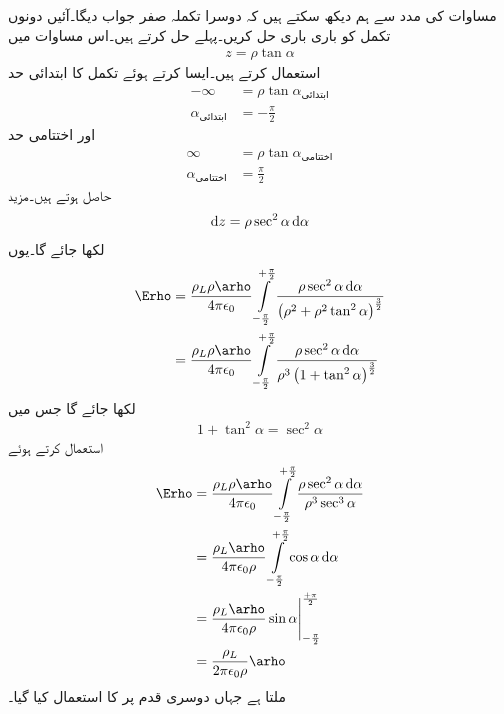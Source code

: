 مساوات  کی مدد سے ہم دیکھ سکتے ہیں کہ دوسرا تکملہ صفر جواب دیگا۔آئیں دونوں تکمل کو باری باری حل کریں۔پہلے \Erho حل کرتے ہیں۔اس مساوات میں
\begin{align*}
z=\rho \tan \alpha
\end{align*}
استعمال کرتے ہیں۔ایسا کرتے ہوئے تکمل کا ابتدائی حد 
\begin{align*}
-\infty &= \rho \tan \alpha_{\textrm{ابتدائی}}\\
\alpha_{\textrm{ابتدائی}} &= -\frac{\pi}{2}
\end{align*}
اور اختتامی حد
\begin{align*}
\infty &= \rho \tan \alpha_{\textrm{اختتامی}}\\
\alpha_{\textrm{اختتامی}} &= \frac{\pi}{2}
\end{align*}
حاصل ہوتے ہیں۔مزید
\begin{align*}
\dif z=\rho \sec^2 \alpha \dif \alpha
\end{align*}
لکھا جائے گا۔یوں
\begin{align*}
\Erho&=\frac{\rho_L \rho \arho}{4 \pi \epsilon_0}\int\limits_{-\frac{\pi}{2}}^{+\frac{\pi}{2}} \frac{\rho \sec^2 \alpha \dif \alpha}{\left(\rho^2+\rho^2 \tan^2 \alpha \right)^{\frac{3}{2}}}\\
&=\frac{\rho_L \rho \arho}{4 \pi \epsilon_0}\int\limits_{-\frac{\pi}{2}}^{+\frac{\pi}{2}} \frac{\rho \sec^2 \alpha \dif \alpha}{\rho^3 \left(1+ \tan^2 \alpha \right)^{\frac{3}{2}}}
\end{align*}
لکھا جائے گا جس میں
\begin{align*}
1+\tan^2 \alpha=\sec^2 \alpha
\end{align*}
استعمال کرتے ہوئے
\begin{gather}
\begin{aligned}\label{مساوات_کولومب_لامحدود_لکیر_رداسی_میدان}
\Erho&=\frac{\rho_L \rho \arho}{4 \pi \epsilon_0}\int\limits_{-\frac{\pi}{2}}^{+\frac{\pi}{2}} \frac{\rho \sec^2 \alpha \dif \alpha}{\rho^3 \sec^3 \alpha}\\
&=\frac{\rho_L  \arho}{4 \pi \epsilon_0 \rho}\int\limits_{-\frac{\pi}{2}}^{+\frac{\pi}{2}} \cos \alpha \dif \alpha\\
&=\frac{\rho_L  \arho}{4 \pi \epsilon_0 \rho} \eval{\sin \alpha}_{-\frac{\pi}{2}}^{\frac{+\pi}{2}}\\
&=\frac{\rho_L }{2 \pi \epsilon_0 \rho} \arho
\end{aligned}
\end{gather}
ملتا ہے جہاں دوسری  قدم پر  کا استعمال کیا گیا۔


